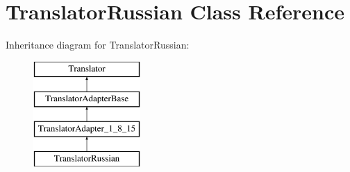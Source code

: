 \hypertarget{class_translator_russian}{}\section{Translator\+Russian Class Reference}
\label{class_translator_russian}
Inheritance diagram for Translator\+Russian\+:\begin{figure}[H]
\begin{center}
\leavevmode
\includegraphics[height=4.000000cm]{class_translator_russian}
\end{center}
\end{figure}
